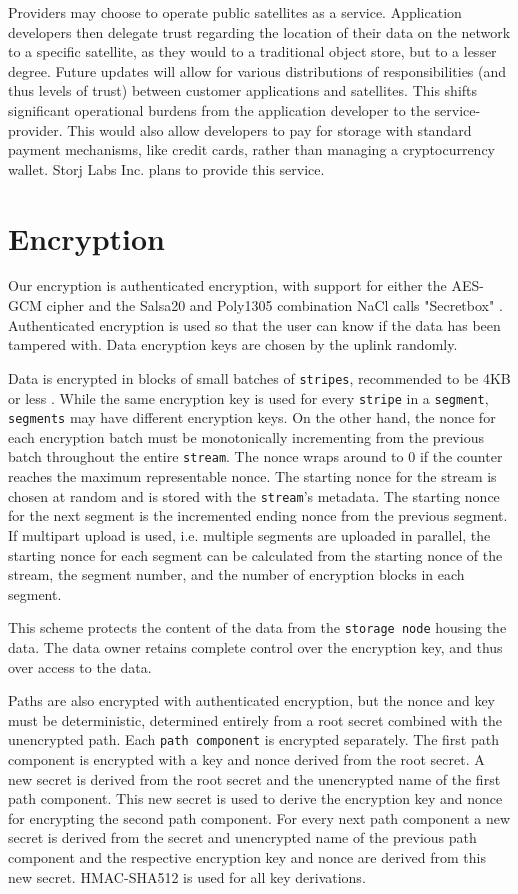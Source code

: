 \documentclass[11pt,fleqn,openany]{book}
\newcommand{\x}[1]{{\tt #1}} \newcommand{\code}[1]{{\em #1}}
\begin{document}
Providers may choose to operate public satellites as a service.
Application developers then delegate trust regarding the location of their
data on the network to a specific satellite, as they
would to a traditional object store, but to a lesser degree. Future updates
will allow for various distributions of responsibilities (and thus levels of
trust) between customer applications and satellites. This shifts significant
operational burdens from the application developer to the service-provider.
This would also allow developers to pay for storage with standard payment
mechanisms, like credit cards, rather than managing a cryptocurrency wallet.
Storj Labs Inc. plans to provide this service.

\section{Encryption}\label{sec:concrete-encryption}

Our encryption is authenticated encryption, with support for either the
AES-GCM cipher and the Salsa20 and Poly1305 combination NaCl calls "Secretbox"
\cite{nacl-crypto}. Authenticated encryption is used so that the user can know
if the data has been tampered with. Data encryption keys are chosen by the
uplink randomly.

Data is encrypted in blocks of small batches of \x{stripes}, recommended to be
4KB or less \cite{nacl-packetlen}. While the same encryption key is used for
every \x{stripe} in a \x{segment}, \x{segments} may have
different encryption keys. On the other hand, the nonce for each encryption
batch must be monotonically incrementing from the previous batch throughout the
entire \x{stream}. The nonce wraps around to 0 if the counter reaches the
maximum representable nonce. The starting nonce for the stream is chosen at
random and is stored with the \x{stream}'s metadata.
The starting nonce for the next segment
is the incremented ending nonce from the previous segment. If multipart upload
is used, i.e. multiple segments are uploaded in parallel, the starting nonce
for each segment can be calculated from the starting nonce of the stream, the
segment number, and the number of encryption blocks in each segment.

This scheme protects the
content of the data from the \x{storage node} housing the data. The data owner
retains complete control over the encryption key, and thus over access to the
data.

Paths are also encrypted with authenticated encryption, but the nonce and key
must be deterministic, determined entirely from a root secret combined with the
unencrypted path. Each \x{path component} is encrypted separately.
The first path component is encrypted with a key and nonce derived from the
root secret. A new secret is derived from the root secret and the unencrypted
name of the first path component. This new secret is used to derive the
encryption key and nonce for encrypting the second path component. For every
next path component a new secret is derived from the secret and unencrypted
name of the previous path component and the respective encryption key and
nonce are derived from this new secret. HMAC-SHA512 is used for all key
derivations.
\end{document}

